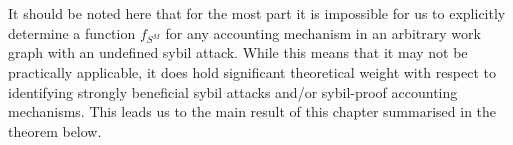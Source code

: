 \begin{comment}
\noindent{}An obiouvs problem arises from this definition of $\omega_{+}^{n}(rep)$, namely the fact that we do not take into account that the accounting values obtained through the sybil attack might be distributed over the number of sybil identities, as opposed to all being attributed to the main attacking node $j$. This may lead to sybil attacks which are very beneficial in terms of accounting values, but not at all in terms of the work that can be consumed. The following example represents this well.

\begin{example}[]\ \\
Let $G=(V,E,w)$ be a work graph with honest node $i$ and attacker $j$. Let $j$ launch a sybil attack $\sigma^n$ with $n$ sybil identities $s_{j1},\ldots,s_{jn}$ and let $S^M()$ be the BarterCast accounting mechanism given by the maxflow algorithm. \cite{Bartercast: A Practical Approach to Prevent Lazy Freeriding in P2P Networks}. Let $G'$ be the work graph after the sybil attack, given by 

\begin{figure}[H]
\begin{center}
\texttt{[image: "Sybil Attack on BarterCast".PNG]}
\caption{Sybil Attack on BarterCast}
\label{fig:Sybil Attack on BarterCast}
\end{center}
\end{figure} 

\noindent{}In this example, we obtain the values $\omega_{-}^{n}(rep)=1$ and $\omega_{+}^{n}(rep)=n$, which implies $\lim\limits_{n\rightarrow\infty}\frac{\omega_{+}^{n}(rep)}{\omega_{-}^{n}(rep)}=\infty$. However, we find that $S^M_{is_{jk}}=1$ f.a. $k=1,\ldots,n$ and because it holds $S^M_k(G_i,C_i)=3$, it is obvious that if $i$'s allocation policy is winner-takes-all, $\omega^{n}_{+}(work)=0$.
\end{example}
\end{comment}

\noindent{}It should be noted here that for the most part it is impossible for us to explicitly determine a function $f_{S^M}$ for any accounting mechanism in an arbitrary work graph with an undefined sybil attack. While this means that it may not be practically applicable, it does hold significant theoretical weight with respect to identifying strongly beneficial sybil attacks and/or sybil-proof accounting mechanisms. This leads us to the main result of this chapter summarised in the theorem below. \vspace{1em}\\ 

